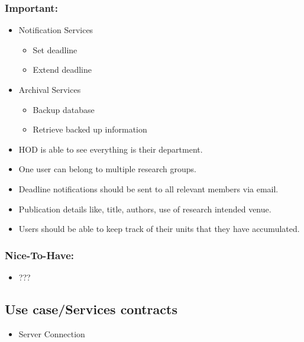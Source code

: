\documentclass[11pt]{article}
\begin{document}
\begin{itemize}
\begin{itemize}
		\end{itemize}
	\end{itemize}
	
\subsubsection{Important:}	
	\begin{itemize}
		\item Notification Services
		\begin{itemize}
			\item Set deadline
			\item Extend deadline
		\end{itemize}
	
		\item Archival Services
		\begin{itemize}
			\item Backup  database
			\item Retrieve backed up information
		\end{itemize}
	\end{itemize}
	\begin{itemize}
		\item HOD is able to see everything is their department.
		\item One user can belong to multiple research groups.
		\item Deadline notifications should be sent to all relevant members via email.
		\item Publication details like, title, authors, use of research intended venue.
		\item Users should be able to keep track of their units that they have accumulated.
	\end{itemize} 
	
\subsubsection{Nice-To-Have:}
	\begin{itemize}
		\item ???
	\end{itemize}

\subsection{Use case/Services contracts}
\begin{itemize}
	\item Server Connection
\end{itemize}
\end{document}
